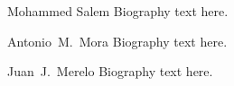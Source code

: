 \documentclass[10pt,journal,compsoc]{IEEEtran}
\begin{document}
\begin{IEEEbiography}{Mohammed Salem}
Biography text here.
\end{IEEEbiography}

\begin{IEEEbiographynophoto}{Antonio~M.~Mora}
Biography text here.
\end{IEEEbiographynophoto}






\begin{IEEEbiographynophoto}{Juan~J.~Merelo}
Biography text here.
\end{IEEEbiographynophoto}






\end{document}
